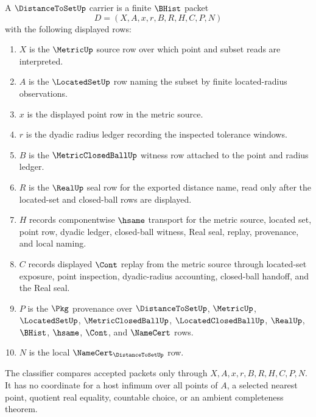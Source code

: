 \begin{definition}
\label{def:distance-to-set-carrier}
A $\DistanceToSetUp$ carrier is a finite $\BHist$ packet
$$
D=(X,A,x,r,B,R,H,C,P,N)
$$
with the following displayed rows:
\begin{enumerate}
\item $X$ is the $\MetricUp$ source row over which point and subset reads are interpreted.
\item $A$ is the $\LocatedSetUp$ row naming the subset by finite located-radius observations.
\item $x$ is the displayed point row in the metric source.
\item $r$ is the dyadic radius ledger recording the inspected tolerance windows.
\item $B$ is the $\MetricClosedBallUp$ witness row attached to the point and radius ledger.
\item $R$ is the $\RealUp$ seal row for the exported distance name, read only after the located-set and closed-ball rows are displayed.
\item $H$ records componentwise $\hsame$ transport for the metric source, located set, point row, dyadic ledger, closed-ball witness, Real seal, replay, provenance, and local naming.
\item $C$ records displayed $\Cont$ replay from the metric source through located-set exposure, point inspection, dyadic-radius accounting, closed-ball handoff, and the Real seal.
\item $P$ is the $\Pkg$ provenance over $\DistanceToSetUp$, $\MetricUp$, $\LocatedSetUp$, $\MetricClosedBallUp$, $\LocatedClosedBallUp$, $\RealUp$, $\BHist$, $\hsame$, $\Cont$, and $\NameCert$ rows.
\item $N$ is the local $\NameCert_{\DistanceToSetUp}$ row.
\end{enumerate}
The classifier compares accepted packets only through $X,A,x,r,B,R,H,C,P,N$. It has no coordinate for a host infimum over all points of $A$, a selected nearest point, quotient real equality, countable choice, or an ambient completeness theorem.
\end{definition}

